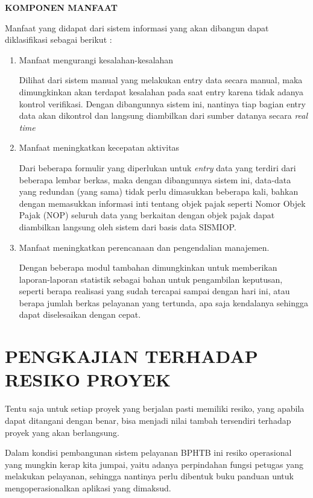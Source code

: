 \documentclass[pdftex,12pt, oneside]{article}
\begin{document}
\textbf{KOMPONEN MANFAAT}

Manfaat yang didapat dari sistem informasi yang akan dibangun dapat diklasifikasi sebagai berikut :

\begin{enumerate}[1.]
  \item Manfaat mengurangi kesalahan-kesalahan
  
Dilihat dari sistem manual yang melakukan entry data secara manual, maka dimungkinkan akan terdapat kesalahan pada saat entry karena tidak adanya kontrol verifikasi. Dengan dibangunnya sistem ini, nantinya tiap bagian entry data akan dikontrol dan langsung diambilkan dari sumber datanya secara \textit{real time}

  \item Manfaat meningkatkan kecepatan aktivitas
  
Dari beberapa formulir yang diperlukan untuk \textit{entry} data yang terdiri dari beberapa lembar berkas, maka dengan dibangunnya sistem ini, data-data yang redundan (yang sama) tidak perlu dimasukkan beberapa kali, bahkan dengan memasukkan informasi inti tentang objek pajak seperti Nomor Objek Pajak (NOP) seluruh data yang berkaitan dengan objek pajak dapat diambilkan langsung oleh sistem dari basis data SISMIOP.

  \item Manfaat meningkatkan perencanaan dan pengendalian manajemen.
  
Dengan beberapa modul tambahan dimungkinkan untuk memberikan laporan-laporan statistik sebagai bahan untuk pengambilan keputusan, seperti berapa realisasi yang sudah tercapai sampai dengan hari ini, atau berapa jumlah berkas pelayanan yang tertunda, apa saja kendalanya sehingga dapat diselesaikan dengan cepat.

\end{enumerate}

\section{PENGKAJIAN TERHADAP RESIKO PROYEK}

Tentu saja untuk setiap proyek yang berjalan pasti memiliki resiko, yang apabila dapat ditangani dengan benar, bisa menjadi nilai tambah tersendiri terhadap proyek yang akan berlangsung.

Dalam kondisi pembangunan sistem pelayanan BPHTB ini resiko operasional yang mungkin kerap kita jumpai, yaitu adanya perpindahan fungsi petugas yang melakukan pelayanan, sehingga nantinya perlu dibentuk buku panduan untuk mengoperasionalkan aplikasi yang dimaksud.
\end{document}
